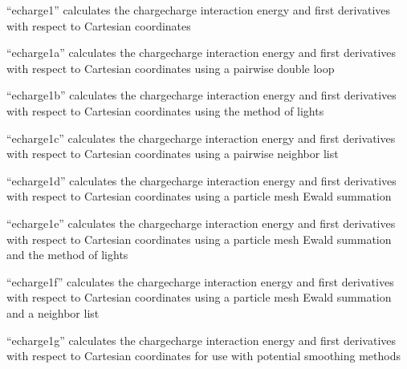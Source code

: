 \documentclass[letterpaper,11pt,english]{sphinxmanual}
\begin{document}
\sphinxAtStartPar
{}

\sphinxAtStartPar
“echarge1” calculates the charge\sphinxhyphen{}charge interaction energy and first derivatives with respect to Cartesian coordinates

\sphinxAtStartPar
{}

\sphinxAtStartPar
“echarge1a” calculates the charge\sphinxhyphen{}charge interaction energy and first derivatives with respect to Cartesian coordinates using a pairwise double loop

\sphinxAtStartPar
{}

\sphinxAtStartPar
“echarge1b” calculates the charge\sphinxhyphen{}charge interaction energy and first derivatives with respect to Cartesian coordinates using the method of lights

\sphinxAtStartPar
{}

\sphinxAtStartPar
“echarge1c” calculates the charge\sphinxhyphen{}charge interaction energy and first derivatives with respect to Cartesian coordinates using a pairwise neighbor list

\sphinxAtStartPar
{}

\sphinxAtStartPar
“echarge1d” calculates the charge\sphinxhyphen{}charge interaction energy and first derivatives with respect to Cartesian coordinates using a particle mesh Ewald summation

\sphinxAtStartPar
{}

\sphinxAtStartPar
“echarge1e” calculates the charge\sphinxhyphen{}charge interaction energy and first derivatives with respect to Cartesian coordinates using a particle mesh Ewald summation and the method of lights

\sphinxAtStartPar
{}

\sphinxAtStartPar
“echarge1f” calculates the charge\sphinxhyphen{}charge interaction energy and first derivatives with respect to Cartesian coordinates using a particle mesh Ewald summation and a neighbor list

\sphinxAtStartPar
{}

\sphinxAtStartPar
“echarge1g” calculates the charge\sphinxhyphen{}charge interaction energy and first derivatives with respect to Cartesian coordinates for use with potential smoothing methods
\end{document}
